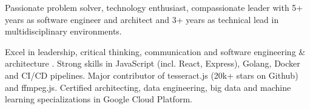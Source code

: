 

\begin{cvparagraph}

Passionate problem solver, technology enthusiast, compassionate leader with 5+ years as software engineer and architect and 3+ years as technical lead in multidisciplinary environments.

Excel in leadership, critical thinking, communication and software engineering \& architecture . Strong skills in JavaScript (incl. React, Express), Golang, Docker and CI/CD pipelines. Major contributor of tesseract.js (20k+ stars on Github) and ffmpeg.js. Certified architecting, data engineering, big data and machine learning specializations in Google Cloud Platform. 
\end{cvparagraph}
